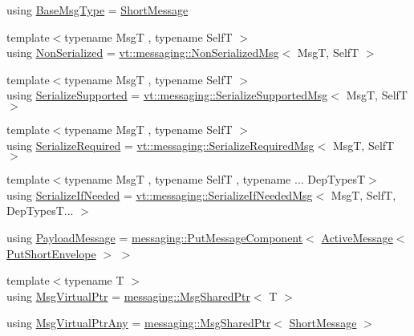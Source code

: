 \begin{DoxyCompactItemize}
using \hyperlink{namespacevt_a44d0d4e144748f2b19a1cfd962f50338}{Base\+Msg\+Type} = \hyperlink{namespacevt_a1125ac1da6c0bbf141e0ea0739d7602d}{Short\+Message}
\item 
{\footnotesize template$<$typename MsgT , typename SelfT $>$ }\\using \hyperlink{namespacevt_a378e4a02213923b4ba1c3f9d2a1424c7}{Non\+Serialized} = \hyperlink{structvt_1_1messaging_1_1_non_serialized_msg}{vt\+::messaging\+::\+Non\+Serialized\+Msg}$<$ MsgT, SelfT $>$
\item 
{\footnotesize template$<$typename MsgT , typename SelfT $>$ }\\using \hyperlink{namespacevt_a3862b8e3f67ab03f3a4313d828592fa9}{Serialize\+Supported} = \hyperlink{structvt_1_1messaging_1_1_serialize_supported_msg}{vt\+::messaging\+::\+Serialize\+Supported\+Msg}$<$ MsgT, SelfT $>$
\item 
{\footnotesize template$<$typename MsgT , typename SelfT $>$ }\\using \hyperlink{namespacevt_a9e60e2e8929828639383ac1d6643384d}{Serialize\+Required} = \hyperlink{structvt_1_1messaging_1_1_serialize_required_msg}{vt\+::messaging\+::\+Serialize\+Required\+Msg}$<$ MsgT, SelfT $>$
\item 
{\footnotesize template$<$typename MsgT , typename SelfT , typename ... Dep\+TypesT$>$ }\\using \hyperlink{namespacevt_a0a4ad8c256fcffa564e9fa7800e4b495}{Serialize\+If\+Needed} = \hyperlink{structvt_1_1messaging_1_1_serialize_if_needed_msg}{vt\+::messaging\+::\+Serialize\+If\+Needed\+Msg}$<$ MsgT, SelfT, Dep\+Types\+T... $>$
\item 
using \hyperlink{namespacevt_a89a92229c5622b855c02c549f83a1a68}{Payload\+Message} = \hyperlink{structvt_1_1messaging_1_1_put_message_component}{messaging\+::\+Put\+Message\+Component}$<$ \hyperlink{namespacevt_a00eb67bd138395b6a4f744fab3fa0678}{Active\+Message}$<$ \hyperlink{namespacevt_a8d7a7de9e76bfea1600009a775b7298c}{Put\+Short\+Envelope} $>$ $>$
\item 
{\footnotesize template$<$typename T $>$ }\\using \hyperlink{namespacevt_a82b5c92ea7ca3ddd2e8a2e27df87fa1a}{Msg\+Virtual\+Ptr} = \hyperlink{structvt_1_1messaging_1_1_msg_shared_ptr}{messaging\+::\+Msg\+Shared\+Ptr}$<$ T $>$
\item 
using \hyperlink{namespacevt_a54674b9f819f4f3a652c6f78d9b62aaf}{Msg\+Virtual\+Ptr\+Any} = \hyperlink{structvt_1_1messaging_1_1_msg_shared_ptr}{messaging\+::\+Msg\+Shared\+Ptr}$<$ \hyperlink{namespacevt_a1125ac1da6c0bbf141e0ea0739d7602d}{Short\+Message} $>$

\end{DoxyCompactItemize}
